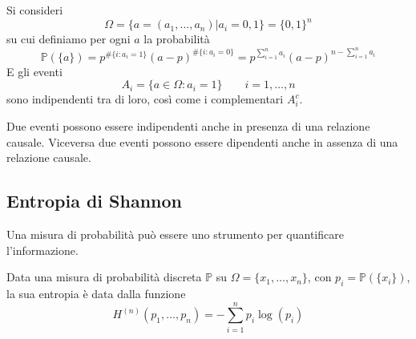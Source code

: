 \begin{proposition}
	Si consideri
	\begin{equation*}
		\Omega = \{a=(a_1, \ldots, a_n) \vert a_i = 0,1\} = \{0, 1\}^n
	\end{equation*}
	su cui definiamo per ogni $a$ la probabilità
	\begin{equation*}
		\mathbb{P}(\{a\}) = p^ {\# \{i:a_i = 1\}} (a-p)^{\# \{i:a_i = 0\}} = p^{\sum_{i=1}^{n}a_i}(a-p)^{n-\sum_{i=1}^{n} a_i}
	\end{equation*}
	E gli eventi
	\begin{equation*}
		A_i = \{a \in \Omega: a_i = 1\} \quad\quad i = 1, \ldots, n
	\end{equation*}
	sono indipendenti tra di loro, così come i complementari $A^c_i$.
\end{proposition}

\begin{observation}
	Due eventi possono essere indipendenti anche in presenza di una relazione causale. Viceversa due eventi possono essere dipendenti anche in assenza di una relazione causale.
\end{observation}

\subsection{Entropia di Shannon}
Una misura di probabilità può essere uno strumento per quantificare l'informazione.
\begin{definition}[Entropia]
	Data una misura di probabilità discreta $\mathbb{P}$ su $\Omega = \{x_1, \ldots, x_n\}$, con $p_i = \mathbb{P}(\{x_i\})$, la sua entropia è data dalla funzione
	\begin{equation}
		H^{(n)}(p_1, \ldots, p_n) = - \sum_{i=1}^{n}p_i \log(p_i)
	\end{equation}
\end{definition}

